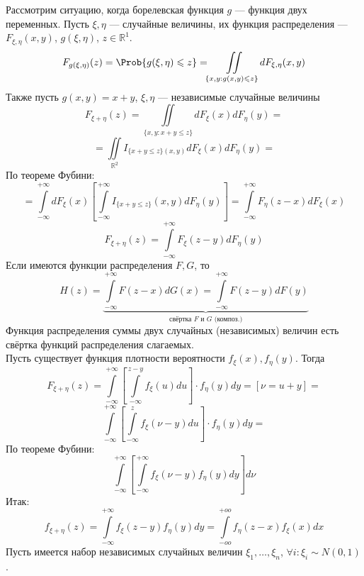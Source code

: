 Рассмотрим ситуацию, когда борелевская функция $g$ --- функция двух переменных. Пусть $\xi, \eta$ --- случайные величины, их функция распределения --- $F_{\xi, \eta} (x, y)$, $g(\xi, \eta)$, $z \in \mathbb{R}^1$.
	\[
		F_{g(\xi, \eta)} (z) = \Prob \{ g(\xi, \eta) \leqslant z \} = \iint\limits_{\{ x, y : g(x, y) \leqslant z \}} d F_{\xi, \eta} (x, y)
	\]
	Также пусть $g(x, y) = x + y$, $\xi, \eta$ --- независимые случайные величины
	\[
		F_{\xi + \eta} (z) = \iint\limits_{\{ x, y : x + y \leqslant z \}} dF_{\xi} (x) dF_{\eta} (y) =
	\]
	\[
		= \iint\limits_{\mathbb{R}^2} I_{\{ x + y \leqslant z \} (x, y)} dF_{\xi} (x) dF_{\eta} (y) =
	\]
	По теореме Фубини:
	\[
		= \int\limits_{-\infty}^{+\infty} dF_{\xi} (x) \left[ \int\limits_{-\infty}^{+\infty} I_{\{ x + y \leqslant z \}} (x, y) dF_{\eta} (y) \right] = \int\limits_{-\infty}^{+\infty} F_{\eta} (z-x) dF_{\xi} (x)
	\]
	\[
		F_{\xi + \eta} (z) = \int\limits_{-\infty}^{+\infty} F_{\xi} (z - y) dF_{\eta} (y)
	\]
	Если имеются функции распределения $F, G$, то
	\[
		H (z) = \underbrace{\int\limits_{-\infty}^{+\infty} F(z-x) dG(x) = \int\limits_{-\infty}^{+\infty} F(z - y) dF(y)}_{\text{свёртка $F$ и $G$ (композ.)}}
	\]
	Функция распределения суммы двух случайных (независимых) величин есть свёртка функций распределения слагаемых. \\
Пусть существует функция плотности вероятности $f_{\xi} (x), f_{\eta} (y)$. Тогда
\[
	F_{\xi + \eta} (z) = \int\limits_{-\infty}^{+\infty} \left[ \int\limits_{-\infty}^{z-y} f_{\xi} (u) du \right] \cdot f_{\eta} (y) dy = [\nu = u + y] =
\]
\[
	\int\limits_{-\infty}^{+\infty} \left[ \int\limits_{-\infty}^{z} f_{\xi} (\nu - y)du \right] \cdot f_{\eta} (y) dy =
\]
По теореме Фубини:
\[
	\int\limits_{-\infty}^{+\infty} \left[ \int\limits_{-\infty}^{+\infty} f_{\xi} (\nu - y) f_{\eta} (y) dy \right] d\nu
\]
Итак:
\[
	f_{\xi + \eta} (z) = \int\limits_{-\infty}^{+\infty} f_{\xi} (z - y) f_{\eta} (y) dy = \int\limits_{-oo}^{+oo} f_{\eta} (z - x) f_{\xi} (x) dx
\]
Пусть имеется набор независимых случайных величин $\xi_1, \ldots, \xi_n$, $\forall i : \xi_i \sim N (0,1)$. \\

